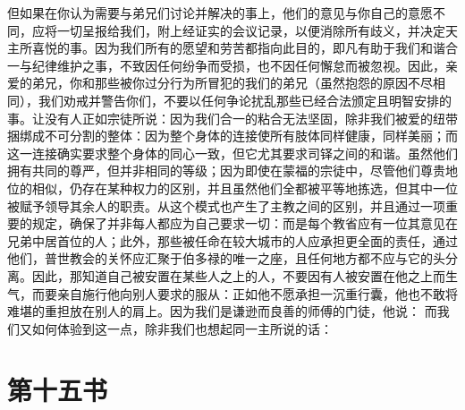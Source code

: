 但如果在你认为需要与弟兄们讨论并解决的事上，他们的意见与你自己的意愿不同，应将一切呈报给我们，附上经证实的会议记录，以便消除所有歧义，并决定天主所喜悦的事。因为我们所有的愿望和劳苦都指向此目的，即凡有助于我们和谐合一与纪律维护之事，不致因任何纷争而受损，也不因任何懈怠而被忽视。因此，亲爱的弟兄，你和那些被你过分行为所冒犯的我们的弟兄（虽然抱怨的原因不尽相同），我们劝戒并警告你们，不要以任何争论扰乱那些已经合法颁定且明智安排的事。让没有人正如宗徒所说：因为我们合一的粘合无法坚固，除非我们被爱的纽带捆绑成不可分割的整体：因为整个身体的连接使所有肢体同样健康，同样美丽；而这一连接确实要求整个身体的同心一致，但它尤其要求司铎之间的和谐。虽然他们拥有共同的尊严，但并非相同的等级；因为即使在蒙福的宗徒中，尽管他们尊贵地位的相似，仍存在某种权力的区别，并且虽然他们全都被平等地拣选，但其中一位被赋予领导其余人的职责。从这个模式也产生了主教之间的区别，并且通过一项重要的规定，确保了并非每人都应为自己要求一切：而是每个教省应有一位其意见在兄弟中居首位的人；此外，那些被任命在较大城市的人应承担更全面的责任，通过他们，普世教会的关怀应汇聚于伯多禄的唯一之座，且任何地方都不应与它的头分离。因此，那知道自己被安置在某些人之上的人，不要因有人被安置在他之上而生气，而要亲自施行他向别人要求的服从：正如他不愿承担一沉重行囊，他也不敢将难堪的重担放在别人的肩上。因为我们是谦逊而良善的师傅的门徒，他说： 而我们又如何体验到这一点，除非我们也想起同一主所说的话：\par



\section{第十五书}

\par

